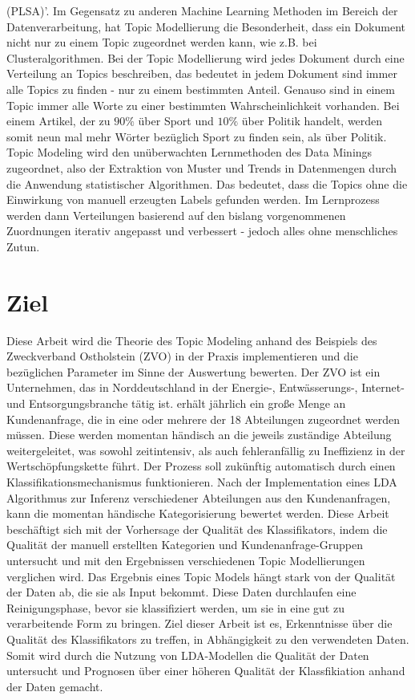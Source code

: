 \documentclass[german,version-2020-11]{uzl-thesis}
\begin{document}
(PLSA)'. Im Gegensatz zu anderen Machine Learning Methoden im Bereich der Datenverarbeitung, hat Topic Modellierung die Besonderheit, dass ein Dokument nicht nur zu einem Topic zugeordnet werden kann, wie z.B. bei Clusteralgorithmen. Bei der Topic Modellierung wird jedes Dokument durch eine Verteilung an Topics beschreiben, das bedeutet in jedem Dokument sind immer alle Topics zu finden - nur zu einem bestimmten Anteil. Genauso sind in einem Topic immer alle Worte zu einer bestimmten Wahrscheinlichkeit vorhanden. Bei einem Artikel, der zu $90\%$ über Sport und $10\%$ über Politik handelt, werden somit neun mal mehr Wörter bezüglich Sport zu finden sein, als über Politik. Topic Modeling wird den unüberwachten Lernmethoden des Data Minings zugeordnet, also der Extraktion von Muster und Trends in Datenmengen durch die Anwendung statistischer Algorithmen. Das bedeutet, dass die Topics ohne die Einwirkung von manuell erzeugten Labels gefunden werden. Im Lernprozess werden dann Verteilungen basierend auf den bislang vorgenommenen Zuordnungen iterativ angepasst und verbessert - jedoch alles ohne menschliches Zutun. 

\section{Ziel}
Diese Arbeit wird die Theorie des Topic Modeling anhand des Beispiels des Zweckverband Ostholstein (ZVO) in der Praxis implementieren und die bezüglichen Parameter im Sinne der Auswertung bewerten. Der ZVO ist ein Unternehmen, das in Norddeutschland in der Energie-, Entwässerungs-, Internet- und Entsorgungsbranche tätig ist.  erhält jährlich ein große Menge an Kundenanfrage, die in eine oder mehrere der 18 Abteilungen zugeordnet werden müssen. Diese werden momentan händisch an die jeweils zuständige Abteilung weitergeleitet, was sowohl zeitintensiv, als auch fehleranfällig zu Ineffizienz in der Wertschöpfungskette führt. Der Prozess soll zukünftig automatisch durch einen Klassifikationsmechanismus funktionieren. Nach der Implementation eines LDA Algorithmus zur Inferenz verschiedener Abteilungen aus den Kundenanfragen, kann die momentan händische Kategorisierung bewertet werden. Diese Arbeit beschäftigt sich mit der Vorhersage der Qualität des Klassifikators, indem die Qualität der manuell erstellten Kategorien und Kundenanfrage-Gruppen untersucht und mit den Ergebnissen verschiedenen Topic Modellierungen verglichen wird. Das Ergebnis eines Topic Models hängt stark von der Qualität der Daten ab, die sie als Input bekommt. Diese Daten durchlaufen eine Reinigungsphase, bevor sie klassifiziert werden, um sie in eine gut zu verarbeitende Form zu bringen. Ziel dieser Arbeit ist es, Erkenntnisse über die Qualität des Klassifikators zu treffen, in Abhängigkeit zu den verwendeten Daten. Somit wird durch die Nutzung von LDA-Modellen die Qualität der Daten untersucht und Prognosen über einer höheren Qualität der Klassfikiation anhand der Daten gemacht. 
\end{document}
